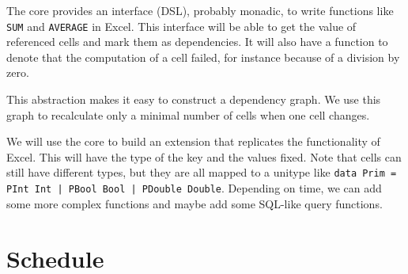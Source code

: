 \documentclass{article}
\begin{document}
	The core provides an interface (DSL), probably monadic, to write functions like \texttt{SUM} and \texttt{AVERAGE} in Excel. This interface will be able to get the value of referenced cells and mark them as dependencies. It will also have a function to denote that the computation of a cell failed, for instance because of a division by zero.
	
	This abstraction makes it easy to construct a dependency graph. We use this graph to recalculate only a minimal number of cells when one cell changes.
	
	We will use the core to build an extension that replicates the functionality of Excel. This will have the type of the key and the values fixed. Note that cells can still have different types, but they are all mapped to a unitype like \texttt{data Prim = PInt Int | PBool Bool | PDouble Double}. Depending on time, we can add some more complex functions and maybe add some SQL-like query functions.
	
	\section{Schedule}
\end{document}
